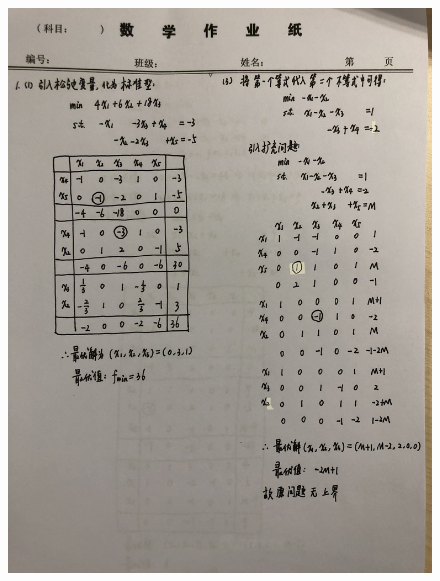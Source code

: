 \documentclass[a4paper]{article}
\begin{document}
\begin{figure}[htbp]
	\centering
	\includegraphics[height=23cm]{1.JPG}
\end{figure}
\end{document}
